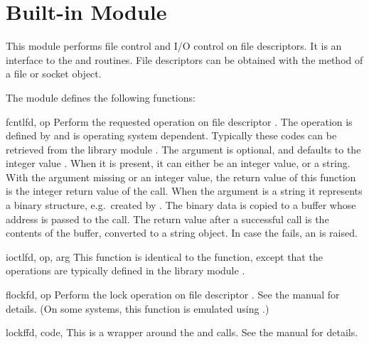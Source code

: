 \section{Built-in Module }
\label{module-fcntl}

This module performs file control and I/O control on file descriptors.
It is an interface to the  and 
\UNIX{} routines.  File descriptors can be obtained with the
 method of a file or socket object.

The module defines the following functions:


\begin{funcdesc}{fcntl}{fd, op}
  Perform the requested operation on file descriptor .
  The operation is defined by  and is operating system
  dependent.  Typically these codes can be retrieved from the library
  module . The argument  is optional, and
  defaults to the integer value .  When
  it is present, it can either be an integer value, or a string.  With
  the argument missing or an integer value, the return value of this
  function is the integer return value of the \C{} 
  call.  When the argument is a string it represents a binary
  structure, e.g.\ created by . The binary
  data is copied to a buffer whose address is passed to the \C{}
   call.  The return value after a successful call
  is the contents of the buffer, converted to a string object.  In
  case the  fails, an  is
  raised.
\end{funcdesc}

\begin{funcdesc}{ioctl}{fd, op, arg}
  This function is identical to the  function, except
  that the operations are typically defined in the library module
  .
\end{funcdesc}

\begin{funcdesc}{flock}{fd, op}
Perform the lock operation  on file descriptor .
See the \UNIX{} manual for details.  (On some systems, this function is
emulated using .)
\end{funcdesc}

\begin{funcdesc}{lockf}{fd, code, }
This is a wrapper around the  and
  calls.  See the \UNIX{}
manual for details.
\end{funcdesc}


